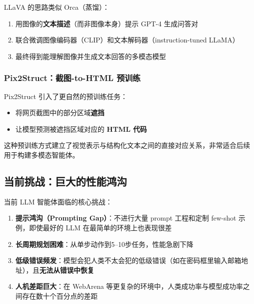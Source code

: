 \documentclass[a4paper]{article}
\begin{document}
LLaVA 的思路类似 Orca（蒸馏）：

\begin{enumerate}
    \item 用图像的\textbf{文本描述}（而非图像本身）提示 GPT-4 生成问答对
    \item 联合微调图像编码器（CLIP）和文本解码器（instruction-tuned LLaMA）
    \item 最终得到能理解图像并生成文本回答的多模态模型
\end{enumerate}





\subsubsection{Pix2Struct：截图-to-HTML 预训练}

Pix2Struct 引入了更自然的预训练任务：

\begin{itemize}
    \item 将网页截图中的部分区域\textbf{遮挡}
    \item 让模型预测被遮挡区域对应的 \textbf{HTML 代码}
\end{itemize}

这种预训练方式建立了视觉表示与结构化文本之间的直接对应关系，非常适合后续用于构建多模态智能体。





\subsection{当前挑战：巨大的性能鸿沟}





当前 LLM 智能体面临的核心挑战：

\begin{enumerate}
    \item \textbf{提示鸿沟（Prompting Gap）}：不进行大量 prompt 工程和定制 few-shot 示例，即使最好的 LLM 在最简单的环境上也表现很差
    \item \textbf{长周期规划困难}：从单步动作到5--10步任务，性能急剧下降
    \item \textbf{低级错误频发}：模型会犯人类不太会犯的低级错误（如在密码框里输入邮箱地址），且\textbf{无法从错误中恢复}
    \item \textbf{人机差距巨大}：在 WebArena 等更复杂的环境中，人类成功率与模型成功率之间存在数十个百分点的差距
\end{enumerate}
\end{document}
